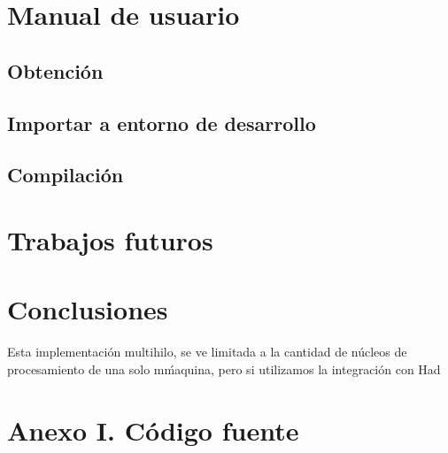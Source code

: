 \documentclass{estilos-y-libreria}
\begin{document}
\chapter{Manual de usuario}
	\section{Obtenci\'on}
		
	\section{Importar a entorno de desarrollo}
		
	\section{Compilaci\'on}
		

\chapter{Trabajos futuros}

\chapter{Conclusiones}
Esta implementación multihilo, se ve limitada a la cantidad de núcleos de procesamiento de una solo m\'maquina, pero si utilizamos la integración con Had


\chapter{Anexo I. C\'odigo fuente}

\end{document}
